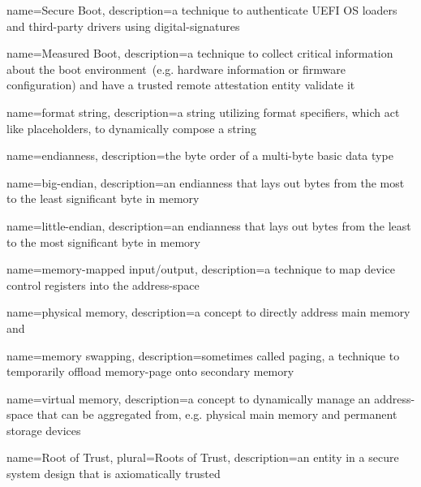 {
  name={Secure Boot},
  description={a technique to authenticate \gls{UEFI} \gls{OS} loaders and third-party drivers using \glspl{digital-signature}}
}

{
  name={Measured Boot},
  description={a technique to collect critical information about the boot environment~(e.g. hardware information or \gls{firmware} configuration) and have a trusted remote attestation entity validate it}
}

{
  name={format string},
  description={a string utilizing format specifiers, which act like placeholders, to dynamically compose a string}
}

{
  name={endianness},
  description={the \gls{byte} order of a multi-\gls{byte} basic data type}
}

{
  name={big-endian},
  description={an \gls{endianness} that lays out \glspl{byte} from the most to the least significant \gls{byte} in memory}
}

{
  name={little-endian},
  description={an \gls{endianness} that lays out \glspl{byte} from the least to the most significant \gls{byte} in memory}
}

{
  name={memory-mapped input/output},
  description={a technique to map device control registers into the  \gls{address-space}}
}

{
  name={physical memory},
  description={a concept to directly address main memory and }
}

{
  name={memory swapping},
  description={sometimes called paging, a technique to temporarily offload \gls{memory-page} onto secondary memory}
}

{
  name={virtual memory},
  description={a concept to dynamically manage an \gls{address-space} that can be aggregated from, e.g. physical main memory and permanent storage devices}
}

{
  name={Root of Trust},
  plural={Roots of Trust},
  description={an entity in a secure system design that is axiomatically trusted}
}

